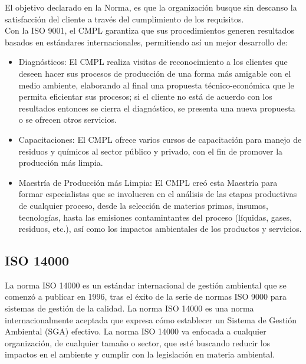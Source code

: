 	El objetivo declarado en la Norma, es que la organización busque sin descanso la satisfacción del cliente a través del cumplimiento de los requisitos. \cite{ISO9001}\\
	
	Con la ISO 9001, el CMPL garantiza que sus procedimientos generen resultados basados en estándares internacionales, permitiendo así un mejor desarrollo de:\\

	\begin{itemize}
		\item Diagnósticos: El CMPL realiza visitas de reconocimiento a los clientes que deseen hacer sus procesos de producción de una forma más amigable con el medio ambiente, elaborando al final una propuesta técnico-económica que le permita eficientar sus procesos; si el cliente no está de acuerdo con los resultados entonces se cierra el diagnóstico, se presenta una nueva propuesta o se ofrecen otros servicios.
		\item Capacitaciones: El CMPL ofrece varios cursos de capacitación para manejo de residuos y químicos al sector público y privado, con el fin de promover la producción más limpia.
		\item Maestría de Producción más Limpia: El CMPL creó esta Maestría para formar especialistas que se involucren en el análisis de las etapas productivas de cualquier proceso, desde la selección de materias primas, insumos, tecnologías, hasta las emisiones contamintantes del proceso (líquidas, gases, residuos, etc.), así como los impactos ambientales de los productos y servicios. \cite{CMPLWebPage}
	\end{itemize}
	
	\subsection{ISO 14000}
	La norma ISO 14000 es un estándar internacional de gestión ambiental que se comenzó a publicar en 1996, tras el éxito de la serie de normas ISO 9000 para sistemas de gestión de la calidad. La norma ISO 14000 es una norma internacionalmente aceptada que expresa cómo establecer un Sistema de Gestión Ambiental (SGA) efectivo. La norma ISO 14000 va enfocada a cualquier organización, de cualquier tamaño o sector, que esté buscando reducir los impactos en el ambiente y cumplir con la legislación en materia ambiental.\\
	
